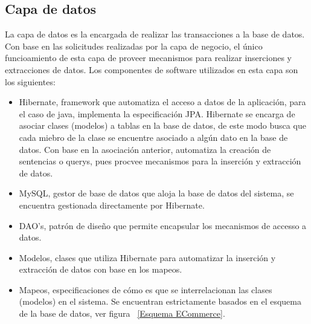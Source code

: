 \subsection{Capa de datos}

La capa de datos es la encargada de realizar las transacciones a la base de datos. Con base en las solicitudes realizadas por la capa de negocio, el único funcioamiento de esta capa de proveer mecanismos para realizar inserciones y extracciones de datos.
Los componentes de software utilizados en esta capa son los siguientes: \\
\begin{itemize} 
	\item Hibernate, framework que automatiza el acceso a datos de la aplicación, para el caso de java, implementa la especificación JPA. Hibernate se encarga de asociar clases (modelos) a tablas en la base de datos, de este modo busca que cada miebro de la clase se encuentre asociado a algún dato en la base de datos. Con base en la asociación anterior, automatiza la creación de sentencias o querys, pues procvee mecanismos para la inserción y extracción de datos.
	\item MySQL, gestor de base de datos que aloja la base de datos del sistema, se encuentra gestionada directamente por Hibernate.
	\item DAO's, patrón de diseño que permite encapsular los mecanismos de accesso a datos.
	\item Modelos, clases que utiliza Hibernate para automatizar la inserción y extracción de datos con base en los mapeos.
	\item Mapeos, especificaciones de cómo es que se interrelacionan las clases (modelos) en el sistema. Se encuentran estrictamente basados en el esquema de la base de datos, ver figura ~\ref{Esquema ECommerce}.
\end{itemize}






